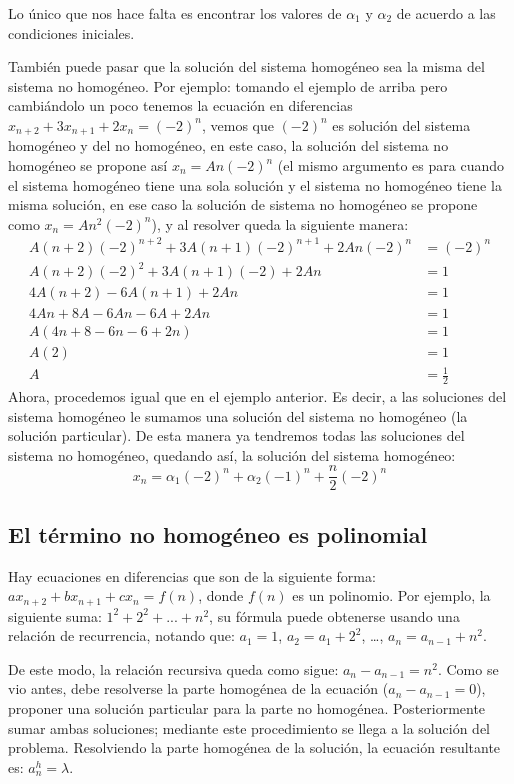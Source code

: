 \documentclass{report}
\theoremstyle{definition}
\begin{document}
Lo único que nos hace falta es encontrar los valores de $\alpha_1$ y $\alpha_2$ de acuerdo a las condiciones iniciales.

También puede pasar que la solución del sistema homogéneo sea la misma del sistema no homogéneo. Por ejemplo: tomando el ejemplo de arriba pero cambiándolo un poco tenemos la ecuación en diferencias $x_{n+2}+3x_{n+1}+2x_n=(-2)^n$, vemos que $(-2)^n$ es solución del sistema homogéneo y del no homogéneo, en este caso, la solución del sistema no homogéneo se propone así $x_n=An(-2)^n$ (el mismo argumento es para cuando el sistema homogéneo tiene una sola solución y el sistema no homogéneo tiene la misma solución, en ese caso la solución de sistema no homogéneo se propone como $x_n=An^2(-2)^n$), y al resolver queda la siguiente manera:
\begin{align*}
  A(n+2)(-2)^{n+2}+3A(n+1)(-2)^{n+1}+2An(-2)^n&=(-2)^n\\
  A(n+2)(-2)^2+3A(n+1)(-2)+2An&=1\\
  4A(n+2)-6A(n+1)+2An&=1\\
  4An+8A-6An-6A+2An&=1\\
  A(4n+8-6n-6+2n)&=1\\
  A(2)&=1\\
  A&=\frac{1}{2}
\end{align*}
Ahora, procedemos igual que en el ejemplo anterior. Es decir, a las soluciones del sistema homogéneo le sumamos una solución del sistema no homogéneo (la solución particular). De esta manera ya tendremos todas las soluciones del sistema no homogéneo, quedando así, la solución del sistema homogéneo:
$$x_n=\alpha_1(-2)^n+\alpha_2(-1)^n+\frac{n}{2}(-2)^n$$
\subsection{El término no homogéneo es polinomial}
\label{sec:polinomial}

Hay ecuaciones en diferencias que son de la siguiente forma: $ax_{n+2}+bx_{n+1}+cx_n=f(n)$, donde $f(n)$ es un polinomio. Por ejemplo, la siguiente suma: $1^2+2^2+...+n^2$, su fórmula puede obtenerse usando una relación de recurrencia, notando que:
$a_1=1$, $a_2=a_1+2^2$, \dots, $a_n=a_{n-1}+n^2$.


De este modo, la relación recursiva queda como sigue:
$a_{n}-a_{n-1}=n^2$.  Como se vio antes, debe resolverse la parte
homogénea de la ecuación ($a_n-a_{n-1}=0$), proponer una solución
particular para la parte no homogénea. Posteriormente sumar ambas
soluciones; mediante este procedimiento se llega a la solución del problema.
Resolviendo la parte homogénea de la solución, la ecuación resultante
es: $a^h_n=\lambda$.
\end{document}
